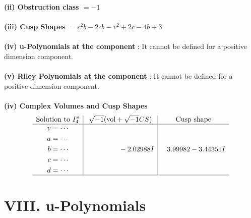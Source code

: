 \documentclass[1p]{elsarticle_modified}
\theoremstyle{definition}
\newcommand{\I}{\sqrt{-1}}
\begin{document}
\flushleft \textbf{(ii) Obstruction class $= -1$}\\~\\
\flushleft \textbf{(iii) Cusp Shapes $= c^2 b-2 c b- v^2+2 c-4 b+3$}\\~\\
\flushleft \textbf{(iv) u-Polynomials at the component} : It cannot be defined for a positive dimension component.\\~\\
\flushleft \textbf{(v) Riley Polynomials at the component} : It cannot be defined for a positive dimension component.\\~\\
\newpage\flushleft \textbf{(iv) Complex Volumes and Cusp Shapes}
$$\begin{array}{c|c|c} 
\text{Solution to }I^v_{4}& \I (\text{vol} + \sqrt{-1}CS) & \text{Cusp shape}\\
 \hline 
\begin{aligned}
v &= \cdots \\
a &= \cdots \\
b &= \cdots \\
c &= \cdots \\
d &= \cdots\end{aligned}
 & \phantom{-0.000000 } -2.02988 I & \phantom{-}3.99982 - 3.44351 I\\
 \hline 
 \end{array}
$$
\newpage\renewcommand{\arraystretch}{1}
\centering \section*{ VIII. u-Polynomials}
\end{document}
